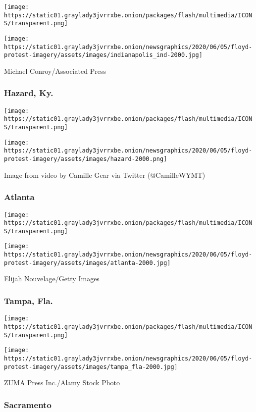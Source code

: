 \texttt{[image: https://static01.graylady3jvrrxbe.onion/packages/flash/multimedia/ICONS/transparent.png]}

\texttt{[image: https://static01.graylady3jvrrxbe.onion/newsgraphics/2020/06/05/floyd-protest-imagery/assets/images/indianapolis\_ind-2000.jpg]}

Michael Conroy/Associated Press

\hypertarget{hazard-ky}{%
\subsubsection{Hazard, Ky.}\label{hazard-ky}}

\texttt{[image: https://static01.graylady3jvrrxbe.onion/packages/flash/multimedia/ICONS/transparent.png]}

\texttt{[image: https://static01.graylady3jvrrxbe.onion/newsgraphics/2020/06/05/floyd-protest-imagery/assets/images/hazard-2000.png]}

Image from video by Camille Gear via Twitter (@CamilleWYMT)

\hypertarget{atlanta}{%
\subsubsection{Atlanta}\label{atlanta}}

\texttt{[image: https://static01.graylady3jvrrxbe.onion/packages/flash/multimedia/ICONS/transparent.png]}

\texttt{[image: https://static01.graylady3jvrrxbe.onion/newsgraphics/2020/06/05/floyd-protest-imagery/assets/images/atlanta-2000.jpg]}

Elijah Nouvelage/Getty Images

\hypertarget{tampa-fla}{%
\subsubsection{Tampa, Fla.}\label{tampa-fla}}

\texttt{[image: https://static01.graylady3jvrrxbe.onion/packages/flash/multimedia/ICONS/transparent.png]}

\texttt{[image: https://static01.graylady3jvrrxbe.onion/newsgraphics/2020/06/05/floyd-protest-imagery/assets/images/tampa\_fla-2000.jpg]}

ZUMA Press Inc./Alamy Stock Photo

\hypertarget{sacramento}{%
\subsubsection{Sacramento}\label{sacramento}}

